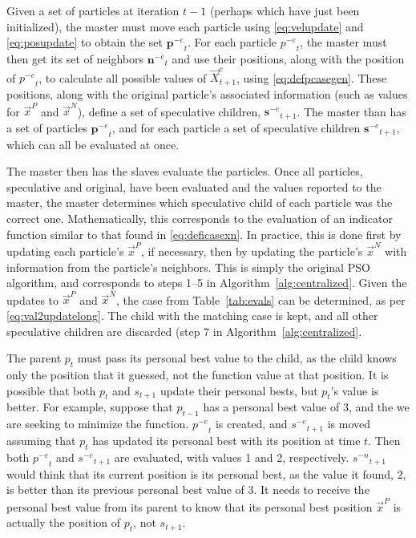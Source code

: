 \documentclass[journal,letterpaper]{IEEEtran}
\newcommand{\alg}[1]{Algorithm~\ref{alg:#1}}
\providecommand{\pers}{\ensuremath{P}}
\providecommand{\neigh}{\ensuremath{N}}
\providecommand{\nbest}{\ensuremath{\Vec{x}^\neigh}}
\providecommand{\pbest}{\ensuremath{\Vec{x}^\pers}}
\providecommand{\specpos}{\ensuremath{\vec{X}}}
\providecommand{\casegen}{\ensuremath{c}}
\providecommand{\noeval}[1]{\ensuremath{#1^{-e}}}
\providecommand{\nonbest}[1]{\ensuremath{#1^{-n}}}
\providecommand{\p}{\ensuremath{p}}
\providecommand{\pset}{\ensuremath{\mathbf{p}}}
\providecommand{\s}{\ensuremath{s}}
\providecommand{\sset}{\ensuremath{\mathbf{s}}}
\providecommand{\nset}{\ensuremath{\mathbf{n}}}
\begin{document}
Given a set of particles at iteration $t-1$ (perhaps which have just been
initialized), the master must move each particle using \eqref{eq:velupdate} and
\eqref{eq:posupdate} to obtain the set $\noeval{\pset}_t$.  For each particle
$\noeval{\p}_t$, the master must then get its set of neighbors
$\noeval{\nset}_t$ and use their positions, along with the position of
$\noeval{\p}_t$, to calculate all possible values of
$\specpos_{t+1}^{\casegen}$, using \eqref{eq:defpcasegen}.  These positions,
along with the original particle's associated information (such as values for
$\pbest$ and $\nbest$), define a set of speculative children,
$\noeval{\sset}_{t+1}$.  The master than has a set of particles
$\noeval{\pset}_t$, and for each particle a set of speculative children
$\noeval{\sset}_{t+1}$, which can all be evaluated at once.

The master then has the slaves evaluate the particles.  Once all particles,
speculative and original, have been evaluated and the values reported to the
master, the master determines which speculative child of each particle was the
correct one.  Mathematically, this corresponds to the evaluation of an
indicator function similar to that found in \eqref{eq:deficasexn}.  In
practice, this is done first by updating each particle's $\pbest$, if
necessary, then by updating the particle's $\nbest$ with information from the
particle's neighbors.  This is simply the original PSO algorithm, and
corresponds to steps 1--5 in \alg{centralized}.  Given the updates to $\pbest$
and $\nbest$, the case from Table~\ref{tab:evals} can be determined, as per
\eqref{eq:val2updatelong}.  The child with the matching case is kept, and all
other speculative children are discarded (step 7 in \alg{centralized}.

The parent $\p_t$ must pass its personal best value to the child, as the child
knows only the position that it guessed, not the function value at that
position.  It is possible that both $\p_t$ and $\s_{t+1}$ update their personal
bests, but $\p_t$'s value is better.  For example, suppose that $\p_{t-1}$ has
a personal best value of 3, and the we are seeking to minimize the function.
$\noeval{\p}_t$ is created, and $\noeval{\s}_{t+1}$ is moved assuming that
$\p_t$ has updated its personal best with its position at time $t$.  Then both
$\noeval{\p}_t$ and $\noeval{\s}_{t+1}$ are evaluated, with values 1 and 2,
respectively.  $\nonbest{\s}_{t+1}$ would think that its current position is
its personal best, as the value it found, 2, is better than its previous
personal best value of 3.  It needs to receive the personal best value from its
parent to know that its personal best position $\pbest$ is actually the
position of $\p_t$, not $\s_{t+1}$.
\end{document}
